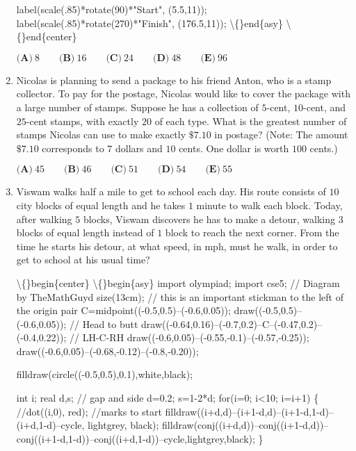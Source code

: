 \documentclass{article}
\begin{document}
\begin{enumerate}[label=\arabic*., itemsep=0.5em]
label(scale(.85)*rotate(90)*"Start", (5.5,11));
label(scale(.85)*rotate(270)*"Finish", (176.5,11));
\textbackslash\{\}end\{asy\}
\textbackslash\{\}end\{center\}

\(\textbf{(A)}\ 8 \qquad \textbf{(B)}\ 16 \qquad \textbf{(C)}\ 24 \qquad \textbf{(D)}\ 48 \qquad \textbf{(E)}\ 96\)\par \vspace{0.5em}\item Nicolas is planning to send a package to his friend Anton, who is a stamp collector. To pay for the postage, Nicolas would like to cover the package with a large number of stamps. Suppose he has a collection of \(5\)-cent, \(10\)-cent, and \(25\)-cent stamps, with exactly \(20\) of each type. What is the greatest number of stamps Nicolas can use to make exactly \(\$7.10\) in postage?
(Note: The amount \(\$7.10\) corresponds to \(7\) dollars and \(10\) cents. One dollar is worth \(100\) cents.)

\(\textbf{(A)}\ 45 \qquad \textbf{(B)}\ 46 \qquad \textbf{(C)}\ 51 \qquad \textbf{(D)}\ 54\qquad \textbf{(E)}\ 55\)\par \vspace{0.5em}\item Viswam walks half a mile to get to school each day. His route consists of \(10\) city blocks of equal length and he takes \(1\) minute to walk each block. Today, after walking \(5\) blocks, Viswam discovers he has to make a detour, walking \(3\) blocks of equal length instead of \(1\) block to reach the next corner. From the time he starts his detour, at what speed, in mph, must he walk, in order to get to school at his usual time?

\textbackslash\{\}begin\{center\}
\textbackslash\{\}begin\{asy\}
import olympiad;
import cse5;
// Diagram by TheMathGuyd
size(13cm);
// this is an important stickman to the left of the origin
pair C=midpoint((-0.5,0.5)--(-0.6,0.05));
draw((-0.5,0.5)--(-0.6,0.05)); // Head to butt
draw((-0.64,0.16)--(-0.7,0.2)--C--(-0.47,0.2)--(-0.4,0.22)); // LH-C-RH
draw((-0.6,0.05)--(-0.55,-0.1)--(-0.57,-0.25));
draw((-0.6,0.05)--(-0.68,-0.12)--(-0.8,-0.20));

filldraw(circle((-0.5,0.5),0.1),white,black);

int i;
real d,s; // gap and side
d=0.2; s=1-2*d;
for(i=0; i<10; i=i+1)
\{
  //dot((i,0), red); //marks to start
  filldraw((i+d,d)--(i+1-d,d)--(i+1-d,1-d)--(i+d,1-d)--cycle, lightgrey, black);
  filldraw(conj((i+d,d))--conj((i+1-d,d))--conj((i+1-d,1-d))--conj((i+d,1-d))--cycle,lightgrey,black);
\}


\end{enumerate}
\end{document}
